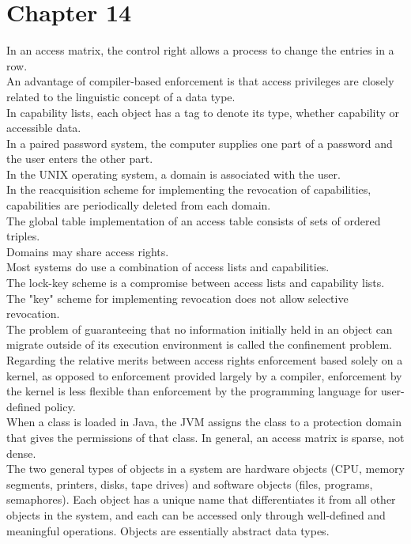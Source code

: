 \documentclass[12pt]{article}
\begin{document}
\section*{\centering Chapter 14}
In an access matrix, the control right allows a process to change the entries in a row.\\[2mm]
An advantage of compiler-based enforcement is that access privileges are closely related to the linguistic concept of a data type.\\[2mm]
In capability lists, each object has a tag to denote its type, whether capability or accessible data.\\[2mm]
In a paired password system, the computer supplies one part of a password and the user enters the other part.\\[2mm]
In the UNIX operating system, a domain is associated with the user.\\[2mm]
In the reacquisition scheme for implementing the revocation of capabilities, capabilities are periodically deleted from each domain.\\[2mm]
The global table implementation of an access table consists of sets of ordered triples.\\[2mm]
Domains may share access rights.\\[2mm]
Most systems do use a combination of access lists and capabilities.\\[2mm]
The lock-key scheme is a compromise between access lists and capability lists.\\[2mm]
The "key" scheme for implementing revocation does not allow selective revocation.\\[2mm]
The problem of guaranteeing that no information initially held in an object can migrate outside of its execution environment is called the confinement problem.\\[2mm]
Regarding the relative merits between access rights enforcement based solely on a kernel, as opposed to enforcement provided largely by a compiler, enforcement by the kernel is less flexible than enforcement by the programming language for user-defined policy.\\[2mm]
When a class is loaded in Java, the JVM assigns the class to a protection domain that gives the permissions of that class. 
In general, an access matrix is sparse, not dense.\\[2mm]
The two general types of objects in a system are hardware objects (CPU, memory segments, printers, disks, tape drives) and software objects (files, programs, semaphores). Each object has a unique name that differentiates it from all other objects in the system, and each can be accessed only through well-defined and meaningful operations. Objects are essentially abstract data types.\\[2mm]
\end{document}
